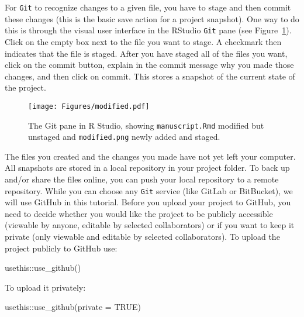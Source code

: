 \documentclass[psych,tutorial,accept,moreauthors,pdftex]{Definitions/mdpi}
\newenvironment{Shaded}{\begin{snugshade}}{\end{snugshade}}
\newcommand{\AttributeTok}[1]{\textcolor[rgb]{0.77,0.63,0.00}{#1}}
\newcommand{\ConstantTok}[1]{\textcolor[rgb]{0.00,0.00,0.00}{#1}}
\newcommand{\FunctionTok}[1]{\textcolor[rgb]{0.00,0.00,0.00}{#1}}
\newcommand{\NormalTok}[1]{#1}
\newcommand{\SpecialCharTok}[1]{\textcolor[rgb]{0.00,0.00,0.00}{#1}}
\begin{document}
\begin{paracol}{2}
For \texttt{Git} to recognize changes to a given file, you have to stage
and then commit these changes (this is the basic save action for a
project snapshot). One way to do this is through the visual user
interface in the RStudio \texttt{Git} pane (see {Figure~\ref{figure2}).}
 Click on
the empty box next to the file you want to stage. A checkmark then
indicates that the file is staged. After you have staged all of the
files you want, click on the commit button, explain in the commit
message why you made those changes, and then click on commit. This
stores a snapshot of the current state of the project.

\begin{figure}[H]
\texttt{[image: Figures/modified.pdf]}
\caption{The Git pane in R Studio, showing
\texttt{manuscript.Rmd} modified but unstaged and \texttt{modified.png}
newly added and staged.}
\label{figure2}
\end{figure}

The files you created and the changes you made have not yet left your
computer. All snapshots are stored in a local repository in your project
folder. To back up and/or share the files online, you can push your
local repository to a remote repository. While you can choose any
\texttt{Git} service (like GitLab or BitBucket), we will use GitHub in
this tutorial. Before you upload your project to GitHub, you need to
decide whether you would like the project to be publicly accessible
(viewable by anyone, editable by selected collaborators) or if you want
to keep it private (only viewable and editable by selected
collaborators). To upload the project publicly to GitHub use:

\begin{adjustwidth}{0.5cm}{0cm} 
\begin{Shaded}
\begin{Highlighting}[]
\NormalTok{usethis}\SpecialCharTok{::}\FunctionTok{use\_github}\NormalTok{()}
\end{Highlighting}
\end{Shaded}
\end{adjustwidth}

To upload it privately:

\begin{adjustwidth}{0.5cm}{0cm} 
\begin{Shaded}
\begin{Highlighting}[]
\NormalTok{usethis}\SpecialCharTok{::}\FunctionTok{use\_github}\NormalTok{(}\AttributeTok{private =} \ConstantTok{TRUE}\NormalTok{)}
\end{Highlighting}
\end{Shaded}
\end{adjustwidth}


\end{paracol}
\end{document}
